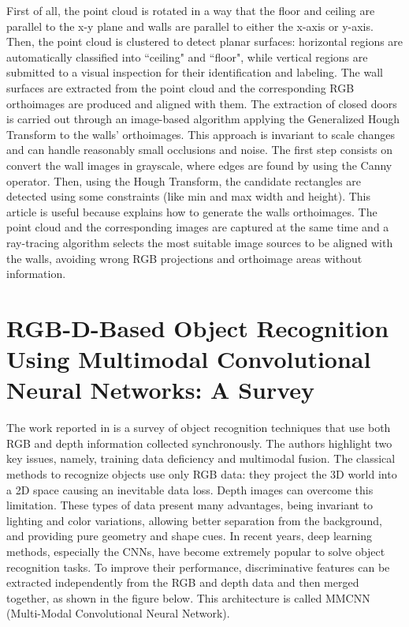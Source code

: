 First of all, the point cloud is rotated in a way that the floor and ceiling are parallel to the x-y
plane and walls are parallel to either the x-axis or y-axis. Then, the point cloud is clustered to detect planar surfaces: horizontal regions are automatically classified into ``ceiling" and ``floor", while vertical
regions are submitted to a visual inspection for their identification and labeling. The wall surfaces are extracted from the point cloud and the corresponding RGB orthoimages are produced and aligned with them. The extraction of closed doors is carried out through an image-based algorithm applying the Generalized Hough Transform to the walls' orthoimages. This approach is invariant to scale changes and can handle reasonably small occlusions and noise. The first step consists on convert the wall images in grayscale, where edges are found by using the Canny operator. Then, using the Hough Transform, the candidate rectangles are detected using some constraints (like min and max width and height). This article is useful because explains how to generate the walls orthoimages. The point cloud and the corresponding images are captured at the same time and a ray-tracing algorithm selects the most suitable image sources to be aligned with the walls, avoiding wrong RGB projections and orthoimage areas without information.

\newpage

\section{RGB-D-Based Object Recognition Using
	Multimodal Convolutional Neural
	Networks: A Survey \cite{8683987}}

The work reported in \cite{8683987} is a survey of object recognition techniques that use both RGB and depth information collected synchronously. The authors highlight two key issues, namely, training data deficiency and multimodal fusion. The classical methods to recognize objects use only RGB data: they project the 3D world into a 2D space causing an inevitable data loss. Depth images can overcome this limitation. These types of data present many
advantages, being invariant to lighting and color variations, allowing better separation from the background, and providing pure geometry and shape cues. In recent years, deep learning methods, especially the CNNs, have become extremely popular to solve object recognition tasks. To improve their performance, discriminative features can be extracted independently from the RGB and depth data and then merged together, as shown in the figure below. This architecture is called MMCNN (Multi-Modal Convolutional Neural Network).

